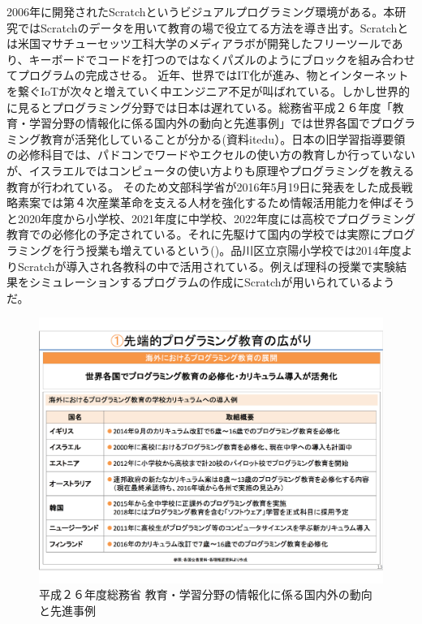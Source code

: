 \documentclass[a4paper,10pt,onecolumn,oneside,openany]{jsbook}
\begin{document}
2006年に開発されたScratchというビジュアルプログラミング環境がある。本研究ではScratchのデータを用いて教育の場で役立てる方法を導き出す。Scratchとは米国マサチューセッツ工科大学のメディアラボが開発したフリーツールであり、キーボードでコードを打つのではなくパズルのようにブロックを組み合わせてプログラムの完成させる。
近年、世界ではIT化が進み、物とインターネットを繋ぐIoTが次々と増えていく中エンジニア不足が叫ばれている。しかし世界的に見るとプログラミング分野では日本は遅れている。総務省平成２６年度「教育・学習分野の情報化に係る国内外の動向と先進事例」では世界各国でプログラミング教育が活発化していることが分かる(資料{itedu}）。日本の旧学習指導要領の必修科目では、パドコンでワードやエクセルの使い方の教育しか行っていないが、イスラエルではコンピュータの使い方よりも原理やプログラミングを教える教育が行われている。
そのため文部科学省が2016年5月19日に発表をした成長戦略素案では第４次産業革命を支える人材を強化するため情報活用能力を伸ばそうと2020年度から小学校、2021年度に中学校、2022年度には高校でプログラミング教育での必修化の予定されている。それに先駆けて国内の学校では実際にプログラミングを行う授業も増えているという(\cite{edu_prog})。品川区立京陽小学校では2014年度よりScratchが導入され各教科の中で活用されている。例えば理科の授業で実験結果をシミュレーションするプログラムの作成にScratchが用いられているようだ。
\begin{figure}[h]
  \centering
    \includegraphics[scale=0.4]{graphic/foreign_data.pdf}
  \caption{平成２６年度総務省 教育・学習分野の情報化に係る国内外の動向と先進事例}
  \label{itedu}
 \end{figure}
 
\end{document}
